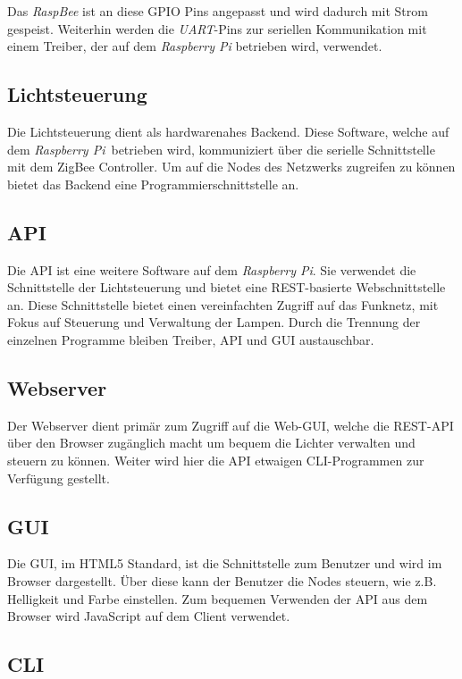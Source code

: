 \documentclass[a4paper,12pt]{article}
\begin{document}
Das \emph{RaspBee} ist an diese GPIO Pins angepasst und wird dadurch mit Strom gespeist.
Weiterhin werden die \emph{UART}-Pins zur seriellen Kommunikation mit einem
Treiber, der auf dem \emph{Raspberry Pi} betrieben wird, verwendet.

\subsection{Lichtsteuerung}

Die Lichtsteuerung dient als hardwarenahes Backend. Diese Software, welche auf
dem \emph{Raspberry Pi} betrieben wird, kommuniziert über die serielle
Schnittstelle mit dem ZigBee Controller. Um auf die Nodes des Netzwerks
zugreifen zu können bietet das Backend eine Programmierschnittstelle an.

\subsection{API}

Die API ist eine weitere Software auf dem \emph{Raspberry Pi}. Sie verwendet
die Schnittstelle der Lichtsteuerung und bietet eine REST-basierte
Webschnittstelle an. Diese Schnittstelle bietet einen vereinfachten Zugriff
auf das Funknetz, mit Fokus auf Steuerung und Verwaltung der Lampen. Durch die
Trennung der einzelnen Programme bleiben Treiber, API und GUI austauschbar.

\subsection{Webserver}

Der Webserver dient primär zum Zugriff auf die Web-GUI, welche die REST-API
über den Browser zugänglich macht um bequem die Lichter verwalten und steuern
zu können. Weiter wird hier die API etwaigen CLI-Programmen zur Verfügung
gestellt.

\subsection{GUI}

Die GUI, im HTML5 Standard, ist die Schnittstelle zum Benutzer und wird im Browser dargestellt.
Über diese kann der Benutzer die Nodes steuern, wie z.B. Helligkeit und Farbe einstellen.
Zum bequemen Verwenden der API aus dem Browser wird JavaScript auf dem Client verwendet. 

\subsection{CLI}
\end{document}
